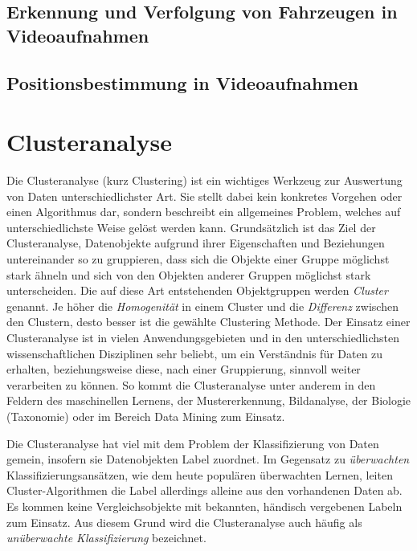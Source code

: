 \subsection{Erkennung und Verfolgung von Fahrzeugen in Videoaufnahmen}
\subsection{Positionsbestimmung in Videoaufnahmen}

\section{Clusteranalyse}
\label{sec:tra_clustering}

Die Clusteranalyse (kurz Clustering) ist ein wichtiges Werkzeug zur Auswertung von Daten unterschiedlichster
Art. Sie stellt dabei kein konkretes Vorgehen oder einen Algorithmus dar, sondern beschreibt ein
allgemeines Problem, welches auf unterschiedlichste Weise gelöst werden kann.
Grundsätzlich ist das Ziel der Clusteranalyse, Datenobjekte aufgrund ihrer Eigenschaften und Beziehungen
untereinander so zu gruppieren, dass sich die Objekte einer Gruppe möglichst stark ähneln und sich
von den Objekten anderer Gruppen möglichst stark unterscheiden. Die auf diese Art entstehenden Objektgruppen werden \textit{Cluster} genannt.
Je höher die \textit{Homogenität} in einem Cluster
und die \textit{Differenz} zwischen den Clustern, desto besser ist die gewählte Clustering Methode.
Der Einsatz einer Clusteranalyse ist in vielen Anwendungsgebieten und in den unterschiedlichsten wissenschaftlichen
Disziplinen sehr beliebt, um ein Verständnis für Daten zu erhalten, beziehungsweise diese, nach einer Gruppierung,
sinnvoll weiter verarbeiten zu können.
So kommt die Clusteranalyse unter anderem in den Feldern des maschinellen Lernens, der Mustererkennung, Bildanalyse,
der Biologie (Taxonomie) oder im Bereich Data Mining zum Einsatz. \cite[]{tan2007introduction}

Die Clusteranalyse hat viel mit dem Problem der Klassifizierung von Daten gemein, insofern sie Datenobjekten
Label zuordnet. Im Gegensatz zu \textit{überwachten} Klassifizierungsansätzen, wie dem heute populären überwachten
Lernen, leiten Cluster-Algorithmen die Label allerdings alleine aus den vorhandenen Daten ab.
Es kommen keine Vergleichsobjekte mit bekannten, händisch vergebenen Labeln zum Einsatz.
Aus diesem Grund wird die Clusteranalyse auch häufig als \textit{unüberwachte Klassifizierung} bezeichnet. \cite[]{tan2007introduction}

